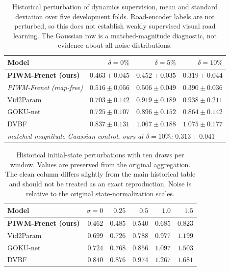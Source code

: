 \documentclass[preprint,12pt]{elsarticle}
\begin{document}
\begin{table}[t]
\centering
\caption{Historical perturbation of dynamics supervision, mean and standard deviation over five development folds. Road-encoder labels are not perturbed, so this does not establish weakly supervised visual road learning. The Gaussian row is a matched-magnitude diagnostic, not evidence about all noise distributions.}
\label{tab:delta}
\small
\begin{tabular}{lrrr}
\toprule
Model & $\delta = 0\%$ & $\delta = 5\%$ & $\delta = 10\%$ \\
\midrule
\textbf{PIWM-Frenet (ours)}     & $0.463 \pm 0.045$ & $0.452 \pm 0.035$ & $\mathbf{0.319 \pm 0.044}$ \\
\emph{PIWM-Frenet (map-free)}   & $0.516 \pm 0.056$ & $0.506 \pm 0.049$ & $0.390 \pm 0.036$ \\
\midrule
Vid2Param                       & $0.703 \pm 0.142$ & $0.919 \pm 0.189$ & $0.938 \pm 0.211$ \\
GOKU-net                        & $0.725 \pm 0.107$ & $0.896 \pm 0.152$ & $0.864 \pm 0.142$ \\
DVBF                            & $0.837 \pm 0.131$ & $1.067 \pm 0.188$ & $1.075 \pm 0.177$ \\
\midrule
\multicolumn{4}{l}{\emph{matched-magnitude Gaussian control, ours at $\delta = 10\%$:}
$0.313 \pm 0.041$} \\
\bottomrule
\end{tabular}
\end{table}
\begin{table}[t]
\centering
\caption{Historical initial-state perturbations with ten draws per window. Values are preserved from the original aggregation. The clean column differs slightly from the main historical table and should not be treated as an exact reproduction. Noise is relative to the original state-normalization scales.}
\label{tab:noise}
\small
\begin{tabular}{lrrrrr}
\toprule
Model & $\sigma = 0$ & $0.25$ & $0.5$ & $1.0$ & $1.5$ \\
\midrule
\textbf{PIWM-Frenet (ours)} & $\mathbf{0.462}$ & $\mathbf{0.485}$ & $\mathbf{0.540}$ & $\mathbf{0.685}$ & $\mathbf{0.823}$ \\
Vid2Param                   & $0.699$ & $0.726$ & $0.788$ & $0.977$ & $1.199$ \\
GOKU-net                    & $0.724$ & $0.768$ & $0.856$ & $1.097$ & $1.503$ \\
DVBF                        & $0.840$ & $0.876$ & $0.974$ & $1.267$ & $1.681$ \\
\bottomrule
\end{tabular}
\end{table}
\end{document}
